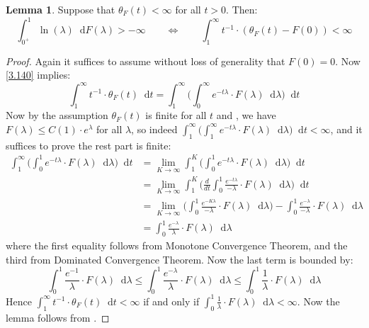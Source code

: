 \documentclass[11pt]{report}
\theoremstyle{definition}
\newtheorem{Lemma}[Def]{Lemma}
\theoremstyle{plain}
\newcommand{\mass}[1]{\mathop{}\mathrm{d}{#1}}
\begin{document}
\begin{Lemma}\label{determinant class}
	Suppose that $\theta_F(t)<\infty$ for all $t>0$. Then:
	\begin{equation}
	\int_{0^+}^1\ln(\lambda)\mass{F(\lambda)}>-\infty \qquad \iff \qquad \int_{1}^{\infty}t^{-1}\cdot (\theta_F(t)-F(0))<\infty
	\end{equation}
\end{Lemma}
\begin{proof}
	Again it suffices to assume without loss of generality that $F(0)=0$. Now \ref{3.140} implies:
\begin{equation*}
\int_1^\infty t^{-1}\cdot \theta_F(t)\mass{t}=\int_1^\infty\Big(\int_0^\infty e^{-t\lambda}\cdot F(\lambda)\mass{\lambda}\Big)\mass{t}
\end{equation*}
Now by the assumption $\theta_F(t)$ is finite for all $t$ and , we have $F(\lambda)\leq C(1)\cdot e^{\lambda}$ for all $\lambda$, so indeed $\int_1^\infty\Big(\int_1^\infty e^{-t\lambda}\cdot F(\lambda)\mass{\lambda}\Big)\mass{t}<\infty$, and it suffices to prove the rest part is finite:
\begin{equation*}
\begin{split}
\int_1^\infty\Big(\int_0^1 e^{-t\lambda}\cdot F(\lambda)\mass{\lambda}\Big)\mass{t}&=\lim_{K\to \infty}\int_1^K\Big(\int_0^1 e^{-t\lambda}\cdot F(\lambda)\mass{\lambda}\Big)\mass{t}\\
&=\lim_{K\to \infty} \int_1^K\Bigg(\frac{d}{dt}\int_0^1\frac{e^{-t\lambda}}{-\lambda}\cdot F(\lambda)\mass{\lambda}\Bigg)\mass{t}\\
&=\lim_{K\to \infty}\Big(\int_{0}^{1}\frac{e^{-K\lambda}}{-\lambda}\cdot F(\lambda)\mass{\lambda}\Big)-\int_{0}^{1}\frac{e^{-\lambda}}{-\lambda}\cdot F(\lambda)\mass{\lambda}\\
&=\int_{0}^{1}\frac{e^{-\lambda}}{\lambda}\cdot F(\lambda)\mass{\lambda}
\end{split}
\end{equation*}
where the first equality follows from Monotone Convergence Theorem, and the third from Dominated Convergence Theorem. Now the last term is bounded by:
\begin{equation*}
\int_{0}^{1}\frac{e^{-1}}{\lambda}\cdot F(\lambda)\mass{\lambda}\leq\int_{0}^{1}\frac{e^{-\lambda}}{\lambda}\cdot F(\lambda)\mass{\lambda}\leq \int_{0}^{1}\frac{1}{\lambda}\cdot F(\lambda)\mass{\lambda}
\end{equation*}
Hence $\int_1^\infty t^{-1}\cdot \theta_F(t)\mass{t}<\infty$ if and only if $\int_{0}^{1}\frac{1}{\lambda}\cdot F(\lambda)\mass{\lambda}<\infty$. Now the lemma follows from .
\end{proof}
\end{document}
